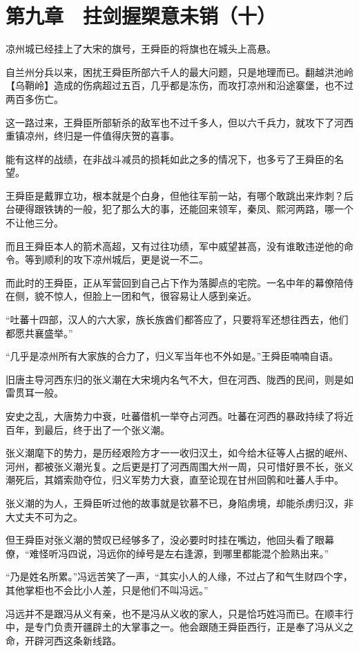 \section{第九章　拄剑握槊意未销（十）}

凉州城已经挂上了大宋的旗号，王舜臣的将旗也在城头上高悬。

自兰州分兵以来，困扰王舜臣所部六千人的最大问题，只是地理而已。翻越洪池岭【乌鞘岭】造成的伤病超过五百，几乎都是冻伤，而攻打凉州和沿途寨堡，也不过两百多伤亡。

这一路过来，王舜臣所部斩杀的敌军也不过千多人，但以六千兵力，就攻下了河西重镇凉州，终归是一件值得庆贺的喜事。

能有这样的战绩，在非战斗减员的损耗如此之多的情况下，也多亏了王舜臣的名望。

王舜臣是戴罪立功，根本就是个白身，但他往军前一站，有哪个敢跳出来炸刺？后台硬得跟铁铸的一般，犯了那么大的事，还能回来领军，秦凤、熙河两路，哪一个不让他三分。

而且王舜臣本人的箭术高超，又有过往功绩，军中威望甚高，没有谁敢违逆他的命令。等到顺利的攻下凉州城后，更是说一不二。

而此时的王舜臣，正从军营回到自己占下作为落脚点的宅院。一名中年的幕僚陪侍在侧，貌不惊人，但脸上一团和气，很容易让人感到亲近。

“吐蕃十四部，汉人的六大家，族长族酋们都答应了，只要将军还想往西去，他们都愿共襄盛举。”

“几乎是凉州所有大家族的合力了，归义军当年也不外如是。”王舜臣喃喃自语。

旧唐主导河西东归的张义潮在大宋境内名气不大，但在河西、陇西的民间，则是如雷贯耳一般。

安史之乱，大唐势力中衰，吐蕃借机一举夺占河西。吐蕃在河西的暴政持续了将近百年，到最后，终于出了一个张义潮。

张义潮麾下的势力，是历经艰险方才一一收归汉土，如今给木征等人占据的岷州、河州，都被张义潮光复。之后更是打了河西周围大州一周，只可惜好景不长，张义潮死后，其婿索勋夺位，归义军势力大衰，直至论现在甘州回鹘和吐蕃人手中。

张义潮的为人，王舜臣听过他的故事就是钦慕不已，身陷虏境，却能杀虏归汉，非大丈夫不可为之。

但王舜臣对张义潮的赞叹已经够多了，没必要时时挂在嘴边，他回头看了眼幕僚，“难怪听冯四说，冯远你的绰号是左右逢源，到哪里都能混个脸熟出来。”

“乃是姓名所累。”冯远苦笑了一声，“其实小人的人缘，不过占了和气生财四个字，其他掌柜也不会比小人差，只是他们不叫冯远。”

冯远并不是跟冯从义有亲，也不是冯从义收的家人，只是恰巧姓冯而已。在顺丰行中，是专门负责开疆辟土的大掌事之一。他会跟随王舜臣西行，正是奉了冯从义之命，开辟河西这条新线路。

